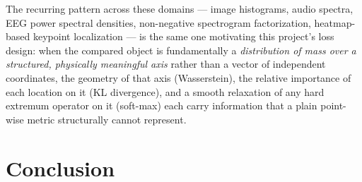\documentclass[11pt,a4paper]{article}
\begin{document}
The recurring pattern across these domains — image histograms, audio
spectra, EEG power spectral densities, non-negative spectrogram
factorization, heatmap-based keypoint localization — is the same one
motivating this project's loss design: when the compared object is
fundamentally a \emph{distribution of mass over a structured, physically
meaningful axis} rather than a vector of independent coordinates, the
geometry of that axis (Wasserstein), the relative importance of each
location on it (KL divergence), and a smooth relaxation of any hard
extremum operator on it (soft-max) each carry information that a plain
point-wise metric structurally cannot represent.

\section{Conclusion}
\end{document}
